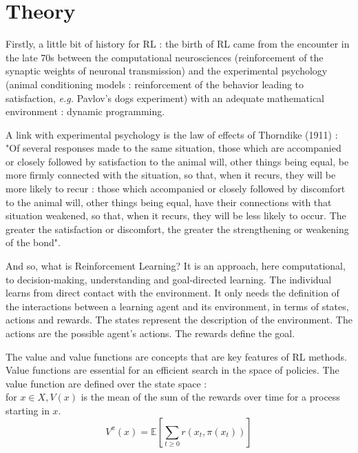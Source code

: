 \documentclass[conference]{IEEEtran}
\newlength\figureheight
\newlength\figurewidth
\begin{document}
%  

\section{Theory}
\label{sec:theory}

Firstly, a little bit of history for RL : the birth of RL came from the encounter in the late 70s between the computational neurosciences (reinforcement of the synaptic weights of neuronal transmission) and the experimental psychology (animal conditioning models : reinforcement of the behavior leading to satisfaction, \textit{e.g.} Pavlov's dogs experiment) 
with an adequate mathematical environment : dynamic programming.

A link with experimental psychology is the law of effects of Thorndike (1911) \cite{MUNOS1}
 : "Of several responses made to the same situation, those which are accompanied or closely followed by satisfaction to the animal will, other things being equal, be more firmly connected with the situation, so that, when it recurs, they will be more likely to recur : those which accompanied or closely followed by discomfort to the animal will, other things being equal, have their connections with that situation weakened, so that, when it recurs, they will be less likely to occur. The greater the satisfaction or discomfort, the greater the strengthening or weakening of the bond".

And so, what is Reinforcement Learning? It is an approach, here computational, to decision-making, understanding and goal-directed learning. 
The individual learns from direct contact with the environment. 
It only needs the definition of the interactions between a learning agent and its environment, in terms of states, actions and rewards.
The states represent the description of the environment.
The actions are the possible agent's actions.
The rewards define the goal.

The value and value functions are concepts that are key features of RL methods. Value functions are essential for an efficient search in the space of policies. 
The value function are defined over the state space : \\
for $x \in X, V(x)$ is the mean of the sum of the rewards over time for a process starting in $x$.
\[ V^{\pi}(x) = \mathbb{E} [ \sum_{t \geqslant 0} r(x_t,\pi(x_t))  ] \]
\end{document}
